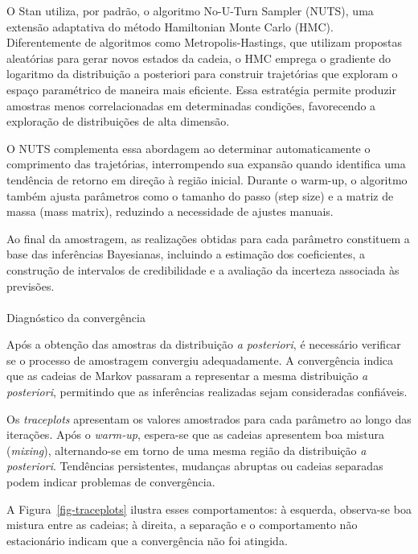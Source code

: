 \documentclass[
  brazilian,
  12pt,
  letterpaper,
  DIV=11,
  numbers=noendperiod]{scrartcl}
\makeatletter
\let\oldparagraph\paragraph
\renewcommand{\paragraph}{
    \@ifstar
      \xxxParagraphStar
      \xxxParagraphNoStar
  }
\newcommand{\xxxParagraphStar}[1]{\oldparagraph*{#1}\mbox{}}
\newcommand{\xxxParagraphNoStar}[1]{\oldparagraph{#1}\mbox{}}
\makeatother
\begin{document}
O Stan utiliza, por padrão, o algoritmo No-U-Turn Sampler (NUTS), uma
extensão adaptativa do método Hamiltonian Monte Carlo (HMC).
Diferentemente de algoritmos como Metropolis-Hastings, que utilizam
propostas aleatórias para gerar novos estados da cadeia, o HMC emprega o
gradiente do logaritmo da distribuição a posteriori para construir
trajetórias que exploram o espaço paramétrico de maneira mais eficiente.
Essa estratégia permite produzir amostras menos correlacionadas em
determinadas condições, favorecendo a exploração de distribuições de
alta dimensão.

O NUTS complementa essa abordagem ao determinar automaticamente o
comprimento das trajetórias, interrompendo sua expansão quando
identifica uma tendência de retorno em direção à região inicial. Durante
o warm-up, o algoritmo também ajusta parâmetros como o tamanho do passo
(step size) e a matriz de massa (mass matrix), reduzindo a necessidade
de ajustes manuais.

Ao final da amostragem, as realizações obtidas para cada parâmetro
constituem a base das inferências Bayesianas, incluindo a estimação dos
coeficientes, a construção de intervalos de credibilidade e a avaliação
da incerteza associada às previsões.

\paragraph{Diagnóstico da
convergência}\label{diagnuxf3stico-da-converguxeancia}

Após a obtenção das amostras da distribuição \emph{a posteriori}, é
necessário verificar se o processo de amostragem convergiu
adequadamente. A convergência indica que as cadeias de Markov passaram a
representar a mesma distribuição \emph{a posteriori}, permitindo que as
inferências realizadas sejam consideradas confiáveis.

Os \emph{traceplots} apresentam os valores amostrados para cada
parâmetro ao longo das iterações. Após o \emph{warm-up}, espera-se que
as cadeias apresentem boa mistura (\emph{mixing}), alternando-se em
torno de uma mesma região da distribuição \emph{a posteriori}.
Tendências persistentes, mudanças abruptas ou cadeias separadas podem
indicar problemas de convergência.

A Figura~\ref{fig-traceplots} ilustra esses comportamentos: à esquerda,
observa-se boa mistura entre as cadeias; à direita, a separação e o
comportamento não estacionário indicam que a convergência não foi
atingida.
\end{document}
